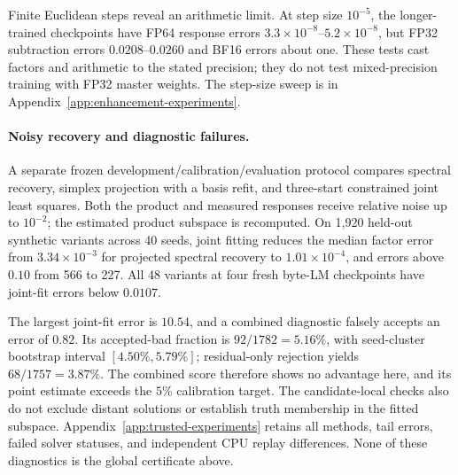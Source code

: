 \begingroup
\let\originaltable\table
\renewcommand{\table}[1][]{\originaltable[H]}

\endgroup

Finite Euclidean steps reveal an arithmetic limit. At step size $10^{-5}$,
the longer-trained checkpoints have FP64 response errors
$3.3\times10^{-8}$--$5.2\times10^{-8}$, but FP32 subtraction errors
$0.0208$--$0.0260$ and BF16 errors about one. These tests cast factors and
arithmetic to the stated precision; they do not test mixed-precision
training with FP32 master weights. The step-size sweep is in
Appendix~\ref{app:enhancement-experiments}.

\paragraph{Noisy recovery and diagnostic failures.}
A separate frozen development/calibration/evaluation protocol compares
spectral recovery, simplex projection with a basis refit, and three-start
constrained joint least squares. Both the product and measured responses
receive relative noise up to $10^{-2}$; the estimated product subspace is
recomputed. On 1,920 held-out synthetic variants across 40 seeds, joint
fitting reduces the median factor error from $3.34\times10^{-3}$ for
projected spectral recovery to $1.01\times10^{-4}$, and errors above $0.10$
from 566 to 227. All 48 variants at four fresh byte-LM checkpoints have
joint-fit errors below $0.0107$.

The largest joint-fit error is $10.54$, and a
combined diagnostic falsely accepts an error of $0.82$. Its accepted-bad
fraction is $92/1782=5.16\%$, with seed-cluster bootstrap interval
$[4.50\%,5.79\%]$; residual-only rejection yields $68/1757=3.87\%$.
The combined score therefore shows no advantage here, and its point
estimate exceeds the $5\%$ calibration target. The candidate-local checks
also do not exclude distant solutions or establish truth membership in the
fitted subspace. Appendix~\ref{app:trusted-experiments} retains all methods,
tail errors, failed solver statuses, and independent CPU replay differences.
None of these diagnostics is the global certificate above.

